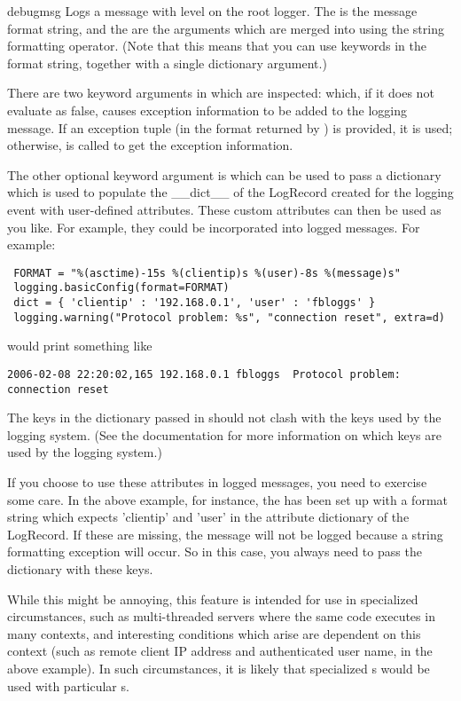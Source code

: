 \begin{funcdesc}{debug}{msg}
Logs a message with level  on the root logger.
The  is the message format string, and the  are the
arguments which are merged into  using the string formatting
operator. (Note that this means that you can use keywords in the
format string, together with a single dictionary argument.)

There are two keyword arguments in  which are inspected:
 which, if it does not evaluate as false, causes exception
information to be added to the logging message. If an exception tuple (in the
format returned by ) is provided, it is used;
otherwise,  is called to get the exception
information.

The other optional keyword argument is  which can be used to pass
a dictionary which is used to populate the __dict__ of the LogRecord created
for the logging event with user-defined attributes. These custom attributes
can then be used as you like. For example, they could be incorporated into
logged messages. For example:

\begin{verbatim}
 FORMAT = "%(asctime)-15s %(clientip)s %(user)-8s %(message)s"
 logging.basicConfig(format=FORMAT)
 dict = { 'clientip' : '192.168.0.1', 'user' : 'fbloggs' }
 logging.warning("Protocol problem: %s", "connection reset", extra=d)
\end{verbatim}

would print something like
\begin{verbatim}
2006-02-08 22:20:02,165 192.168.0.1 fbloggs  Protocol problem: connection reset
\end{verbatim}

The keys in the dictionary passed in  should not clash with the keys
used by the logging system. (See the  documentation for more
information on which keys are used by the logging system.)

If you choose to use these attributes in logged messages, you need to exercise
some care. In the above example, for instance, the  has been
set up with a format string which expects 'clientip' and 'user' in the
attribute dictionary of the LogRecord. If these are missing, the message will
not be logged because a string formatting exception will occur. So in this
case, you always need to pass the  dictionary with these keys.

While this might be annoying, this feature is intended for use in specialized
circumstances, such as multi-threaded servers where the same code executes
in many contexts, and interesting conditions which arise are dependent on this
context (such as remote client IP address and authenticated user name, in the
above example). In such circumstances, it is likely that specialized
s would be used with particular s.


\end{funcdesc}

